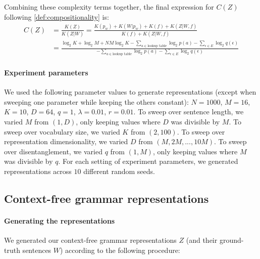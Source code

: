 \documentclass{article} %
\begin{document}
\begin{appendices}
Combining these complexity terms together, the final expression for $C(Z)$ following \cref{def:compositionality} is:
\begin{align*}
    C(Z) &= \frac{K(Z)}{K(Z|W)} = \frac{K(p_w) + K(W|p_w) + K(f) + K(Z|W,f)}{K(f) + K(Z|W,f)} \\
    &=
    \frac{\log_2 K + \log_2 M + NM\log_2 K - \sum_{a \in \text{lookup table}} \log_2 p(a) - \sum_{\epsilon \in E} \log_2 q(\epsilon)}{-\sum_{a \in \text{lookup table}} \log_2 p(a) - \sum_{\epsilon \in E} \log_2 q(\epsilon)}
\end{align*}

\paragraph{Experiment parameters}

We used the following parameter values to generate representations (except when sweeping one parameter while keeping the others constant): $N=1000$, $M=16$, $K=10$, $D=64$, $q=1$, $\lambda=0.01$, $r=0.01$. To sweep over sentence length, we varied $M$ from $(1, D)$, only keeping values where $D$ was divisible by $M$. To sweep over vocabulary size, we varied $K$ from $(2, 100)$. To sweep over representation dimensionality, we varied $D$ from $(M, 2M, ..., 10M)$. To sweep over disentanglement, we varied $q$ from $(1, M)$, only keeping values where $M$ was divisible by $q$. For each setting of experiment parameters, we generated representations across $10$ different random seeds.

\subsection{Context-free grammar representations}

\paragraph{Generating the representations}

We generated our context-free grammar representations $Z$ (and their ground-truth sentences $W$) according to the following procedure:


\end{appendices}
\end{document}
